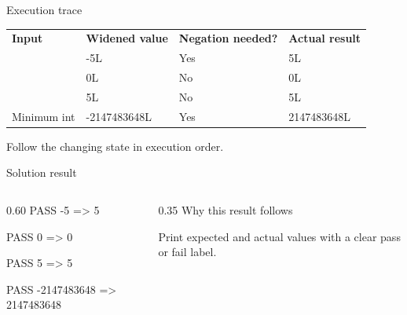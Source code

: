 \documentclass[10pt,aspectratio=169]{beamer}
\begin{document}
\begin{frame}[fragile,t]{Execution trace}
\small\renewcommand{\arraystretch}{1.5}
\begin{tabularx}{\textwidth}{>{\raggedright\arraybackslash}X>{\raggedright\arraybackslash}X>{\raggedright\arraybackslash}X>{\raggedright\arraybackslash}X}
\rowcolor{navy}
\color{white}\bfseries Input & \color{white}\bfseries Widened value & \color{white}\bfseries Negation needed? & \color{white}\bfseries Actual result\\
-5 & -5L & Yes & 5L\\
0 & 0L & No & 0L\\
5 & 5L & No & 5L\\
Minimum int & -2147483648L & Yes & 2147483648L\\
\end{tabularx}
\vspace{3mm}\footnotesize Follow the changing state in execution order.
\end{frame}

\begin{frame}[fragile,t]{Solution result}
\begin{columns}[T,onlytextwidth]\begin{column}{0.60\textwidth}
PASS -5 =\textgreater{} 5\par PASS 0 =\textgreater{} 0\par PASS 5 =\textgreater{} 5\par PASS -2147483648 =\textgreater{} 2147483648
\end{column}\begin{column}{0.35\textwidth}\small
Why this result follows

Print expected and actual values with a clear pass or fail label.
\end{column}\end{columns}
\end{frame}
\end{document}

